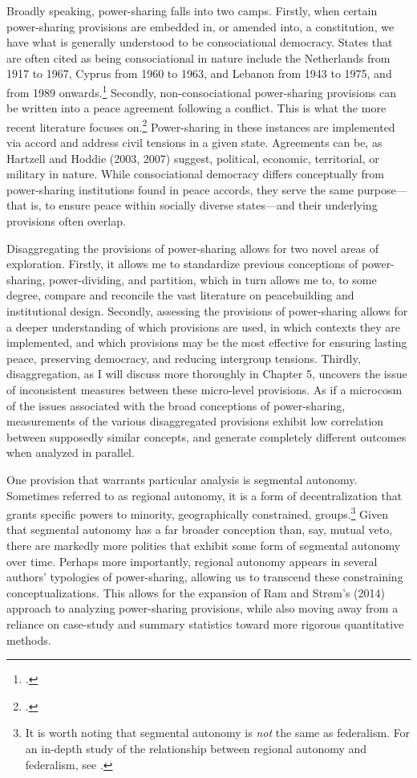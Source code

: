 \documentclass[12pt]{article}
\begin{document}
Broadly speaking, power-sharing falls into two camps. Firstly, when certain power-sharing provisions are embedded in, or amended into, a constitution, we have what is generally understood to be consociational democracy. States that are often cited as being consociational in nature include the Netherlands from 1917 to 1967, Cyprus from 1960 to 1963, and Lebanon from 1943 to 1975, and from 1989 onwards.\footcite{andeweg_consociational_2000, lijphart_consociational_1977, picard_political_2000} Secondly, non-consociational power-sharing provisions can be written into a peace agreement following a conflict. This is what the more recent literature focuses on.\footcite{strom_inclusion_2017, graham_safeguarding_2017, jarstad_words_2008, mukherjee_why_2006} Power-sharing in these instances are implemented via accord and address civil tensions in a given state. Agreements can be, as Hartzell and Hoddie (2003, 2007) suggest, political, economic, territorial, or military in nature. While consociational democracy differs conceptually from power-sharing institutions found in peace accords, they serve the same purpose---that is, to ensure peace within socially diverse states---and their underlying provisions often overlap.

Disaggregating the provisions of power-sharing allows for two novel areas of exploration. Firstly, it allows me to standardize previous conceptions of power-sharing, power-dividing, and partition, which in turn allows me to, to some degree, compare and reconcile the vast literature on peacebuilding and institutional design. Secondly, assessing the provisions of power-sharing allows for a deeper understanding of which provisions are used, in which contexts they are implemented, and which provisions may be the most effective for ensuring lasting peace, preserving democracy, and reducing intergroup tensions. Thirdly, disaggregation, as I will discuss more thoroughly in Chapter 5, uncovers the issue of inconsistent measures between these micro-level provisions. As if a microcosm of the issues associated with the broad conceptions of power-sharing, measurements of the various disaggregated provisions exhibit low correlation between supposedly similar concepts, and generate completely different outcomes when analyzed in parallel. 

One provision that warrants particular analysis is segmental autonomy. Sometimes referred to as regional autonomy, it is a form of decentralization that grants specific powers to minority, geographically constrained, groups.\footnote{It is worth noting that segmental autonomy is \textit{not} the same as federalism. For an in-depth study of the relationship between regional autonomy and federalism, see \cite{lluch_autonomism_2012}.} Given that segmental autonomy has a far broader conception than, say, mutual veto, there are markedly more polities that exhibit some form of segmental autonomy over time. Perhaps more importantly, regional autonomy appears in several authors' typologies of power-sharing, allowing us to transcend these constraining conceptualizations. This allows for the expansion of Ram and Strøm's (2014) approach to analyzing power-sharing provisions, while also moving away from a reliance on case-study and summary statistics toward more rigorous quantitative methods.
\end{document}
